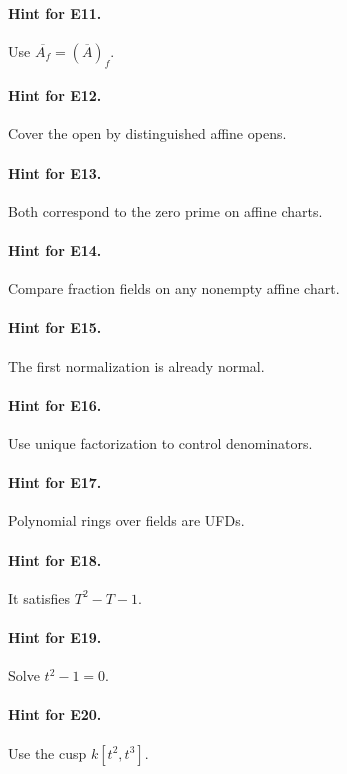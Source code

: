 \paragraph{Hint for E11.} Use $\overline{A_f}=(\overline A)_f$.

\paragraph{Hint for E12.} Cover the open by distinguished affine opens.

\paragraph{Hint for E13.} Both correspond to the zero prime on affine charts.

\paragraph{Hint for E14.} Compare fraction fields on any nonempty affine chart.

\paragraph{Hint for E15.} The first normalization is already normal.

\paragraph{Hint for E16.} Use unique factorization to control denominators.

\paragraph{Hint for E17.} Polynomial rings over fields are UFDs.

\paragraph{Hint for E18.} It satisfies $T^2-T-1$.

\paragraph{Hint for E19.} Solve $t^2-1=0$.

\paragraph{Hint for E20.} Use the cusp $k[t^2,t^3]$.

